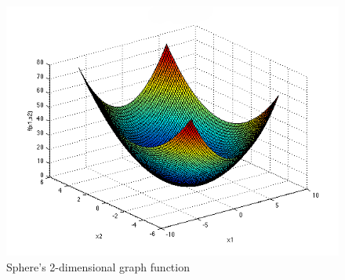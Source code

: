 \documentclass{article}
\begin{document}
\begin{figure}[!h]
\includegraphics[width=\textwidth,height=\textheight,keepaspectratio]{sphere.png}
  \caption{Sphere's 2-dimensional graph function \cite{sf-uni-sp}}
\end{figure}

 
\end{document}
